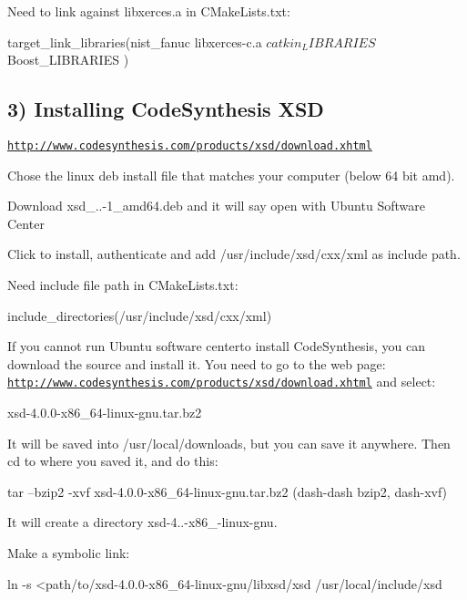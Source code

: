 Need to link against libxerces.\-a in C\-Make\-Lists.\-txt\-: \begin{DoxyVerb}target_link_libraries(nist_fanuc 
libxerces-c.a  
${catkin_LIBRARIES}
${Boost_LIBRARIES}
)
\end{DoxyVerb}


\subsection*{3) Installing Code\-Synthesis X\-S\-D }

\href{http://www.codesynthesis.com/products/xsd/download.xhtml}{\tt http\-://www.\-codesynthesis.\-com/products/xsd/download.\-xhtml}
\begin{DoxyEnumerate}
\item Chose the linux deb install file that matches your computer (below 64 bit amd).
\item Download xsd\-\_..-\/1\-\_\-amd64.\-deb and it will say open with Ubuntu Software Center
\item Click to install, authenticate and add /usr/include/xsd/cxx/xml as include path.
\end{DoxyEnumerate}

Need include file path in C\-Make\-Lists.\-txt\-: \begin{DoxyVerb}include_directories(/usr/include/xsd/cxx/xml)
\end{DoxyVerb}


If you cannot run Ubuntu software centerto install Code\-Synthesis, you can download the source and install it. You need to go to the web page\-: \href{http://www.codesynthesis.com/products/xsd/download.xhtml}{\tt http\-://www.\-codesynthesis.\-com/products/xsd/download.\-xhtml} and select\-: \begin{DoxyVerb}xsd-4.0.0-x86_64-linux-gnu.tar.bz2
\end{DoxyVerb}


It will be saved into /usr/local/downloads, but you can save it anywhere. Then cd to where you saved it, and do this\-: \begin{DoxyVerb}tar --bzip2 -xvf xsd-4.0.0-x86_64-linux-gnu.tar.bz2 (dash-dash bzip2, dash-xvf)
\end{DoxyVerb}


It will create a directory xsd-\/4..-\/x86\-\_-\/linux-\/gnu.

Make a symbolic link\-: \begin{DoxyVerb}ln -s <path/to/xsd-4.0.0-x86_64-linux-gnu/libxsd/xsd /usr/local/include/xsd\end{DoxyVerb}
 